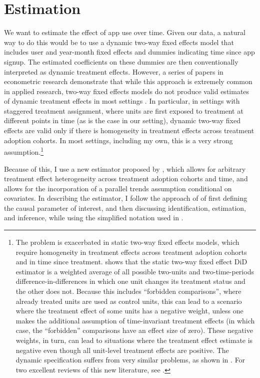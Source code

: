 
\section{Estimation}%
\label{sec:estimation}

We want to estimate the effect of app use over time. Given our data, a natural
way to do this would be to use a dynamic two-way fixed effects model that
includes user and year-month fixed effects and dummies indicating time since
app signup. The estimated coefficients on these dummies are then conventionally
interpreted as dynamic treatment effects. However, a series of papers in
econometric research demonstrate that while this approach is extremely common
in applied research, two-way fixed effects models do not produce valid
estimates of dynamic treatment effects in most settings
\citep{roth2022trending}. In particular, in settings with staggered treatment
assignment, where units are first exposed to treatment at different points in
time (as is the case in our setting), dynamic two-way fixed effects are valid
only if there is homogeneity in treatment effects across treatment adoption
cohorts. In most settings, including my own, this is a very strong
assumption.\footnote{The problem is exacerbated in static two-way fixed effects
    models, which require homogeneity in treatment effects across treatment
    adoption cohorts and in time since treatment. \citet{goodman2021difference}
    shows that the static two-way fixed effect DiD estimator is a weighted
    average of all possible two-units and two-time-periods
    difference-in-differences in which one unit changes its treatment status
    and the other does not. Because this includes ``forbidden comparisons'',
    where already treated units are used as control units, this can lead to a
    scenario where the treatment effect of some units has a negative weight,
    unless one makes the additional assumption of time-invariant treatment
    effects (in which case, the ``forbidden'' comparisons have an effect size
    of zero). These negative weights, in turn, can lead to situations where the
    treatment effect estimate is negative even though all unit-level treatment
    effects are positive. The dynamic specification suffers from very similar
    problems, as shown in \citet{sun2021estimating}. For two excellent
    reviews of this new literature, see \citet{roth2022trending,
baker2022much}.}

Because of this, I use a new estimator proposed by
\citet{callaway2021difference}, which allows for arbitrary treatment effect
heterogeneity across treatment adoption cohorts and time, and allows for the
incorporation of a parallel trends assumption conditional on covariates. In
describing the estimator, I follow the approach of
\citet{callaway2021difference} of first defining the causal parameter of
interest, and then discussing identification, estimation, and inference, while
using the simplified notation used in \citet{roth2022trending}.

